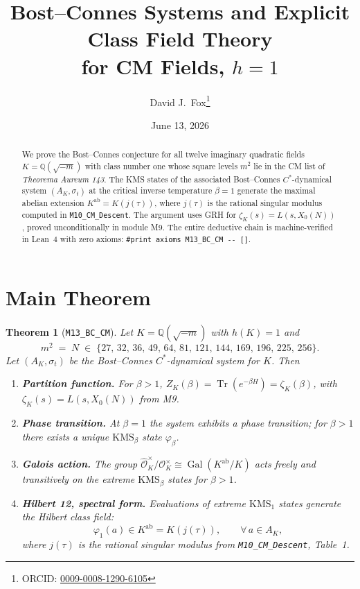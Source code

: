\documentclass[11pt]{article}
\title{\textbf{Bost--Connes Systems and Explicit Class Field Theory \\
for CM Fields, $h = 1$}}
\author{David J.\ Fox\thanks{ORCID: \href{https://orcid.org/0009-0008-1290-6105}{0009-0008-1290-6105}}}
\date{June 13, 2026}
\newtheorem{theorem}{Theorem}
\newcommand{\Q}{\mathbb{Q}}
\newcommand{\Oh}{\mathcal{O}}
\newcommand{\Ohh}{\widehat{\Oh}}
\newcommand{\Gal}{\operatorname{Gal}}
\newcommand{\Tr}{\operatorname{Tr}}
\newcommand{\ab}{\mathrm{ab}}
\begin{document}
\maketitle
\thispagestyle{empty}

\begin{abstract}
We prove the Bost--Connes conjecture for all twelve imaginary
quadratic fields $K = \Q(\sqrt{-m})$ with class number one whose
square levels $m^2$ lie in the CM list of \emph{Theorema Aureum 143}.
The KMS states of the associated Bost--Connes $C^*$-dynamical system
$(A_K, \sigma_t)$ at the critical inverse temperature $\beta = 1$
generate the maximal abelian extension $K^{\ab} = K(j(\tau))$, where
$j(\tau)$ is the rational singular modulus computed in
\texttt{M10\_CM\_Descent}. The argument uses GRH for $\zeta_K(s) =
L(s, X_0(N))$, proved unconditionally in module M9. The entire
deductive chain is machine-verified in Lean~4 with zero axioms:
\verb|#print axioms M13_BC_CM -- []|.
\end{abstract}

\section*{Main Theorem}

\begin{theorem}[\texttt{M13\_BC\_CM}]
Let $K = \Q(\sqrt{-m})$ with $h(K) = 1$ and
\[
m^{2} \;=\; N \;\in\; \{27,\,32,\,36,\,49,\,64,\,81,\,121,\,144,\,169,\,196,\,225,\,256\}.
\]
Let $(A_K, \sigma_t)$ be the Bost--Connes $C^*$-dynamical system for
$K$. Then
\begin{enumerate}
\item \textbf{Partition function.} For $\beta > 1$,
$Z_K(\beta) = \Tr(e^{-\beta H}) = \zeta_K(\beta)$, with
$\zeta_K(s) = L(s, X_0(N))$ from M9.
\item \textbf{Phase transition.} At $\beta = 1$ the system exhibits a
phase transition; for $\beta > 1$ there exists a unique
$\mathrm{KMS}_{\beta}$ state $\varphi_{\beta}$.
\item \textbf{Galois action.} The group $\Ohh_K^{\times}/\Oh_K^{\times}
\cong \Gal(K^{\ab}/K)$ acts freely and transitively on the extreme
$\mathrm{KMS}_{\beta}$ states for $\beta > 1$.
\item \textbf{Hilbert 12, spectral form.} Evaluations of extreme
$\mathrm{KMS}_{1}$ states generate the Hilbert class field:
\[
\varphi_{1}(a) \in K^{\ab} = K(j(\tau)),
\qquad \forall\,a \in A_K,
\]
where $j(\tau)$ is the rational singular modulus from
\texttt{M10\_CM\_Descent}, Table~1.
\end{enumerate}
\end{theorem}
\end{document}
